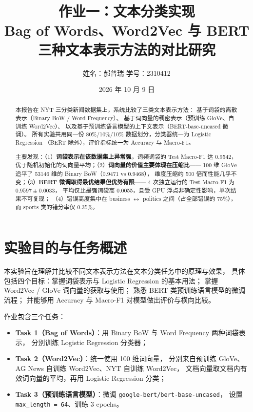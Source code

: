 \documentclass[12pt,a4paper]{ctexart}
\title{\bfseries 作业一：文本分类实现\\[6pt]
\large Bag of Words、Word2Vec 与 BERT 三种文本表示方法的对比研究}
\author{姓名：郝普瑞 \quad 学号：2310412}
\date{2026 年 10 月 9 日}
\newcommand{\fpath}[1]{\texttt{#1}}
\begin{document}
\maketitle

\begin{abstract}
\noindent
本报告在 NYT 三分类新闻数据集上，系统比较了三类文本表示方法：
基于词袋的离散表示（Binary BoW / Word Frequency）、
基于词向量的稠密表示（预训练 GloVe、自训练 Word2Vec）、
以及基于预训练语言模型的上下文表示（BERT-base-uncased 微调）。
所有实验共用同一份 80\%/10\%/10\% 数据划分，分类器统一为 Logistic Regression
（BERT 除外），评价指标统一为 Accuracy 与 Macro-F1。

主要发现：（1）\textbf{词袋表示在该数据集上异常强}，词频词袋的 Test Macro-F1 达 0.9542，
优于随机初始化的词向量平均；（2）\textbf{词向量的价值主要体现在压缩比}——
100 维 GloVe 追平了 53146 维的 Binary BoW（0.9471 vs 0.9468），
维度压缩约 500 倍而性能几乎不变；（3）\textbf{BERT 微调取得最优结果但优势有限}——
4 次独立运行的 Test Macro-F1 为 $0.9597 \pm 0.0033$，
平均仅比最强词袋高 0.0055，且受 GPU 浮点非确定性影响，单次结果不可复现；
（4）错误高度集中在 business $\leftrightarrow$ politics 之间（占全部错误的 75\%），
而 sports 类的错分率仅 0.35\%。
\end{abstract}

\tableofcontents
\newpage

\section{实验目的与任务概述}

本实验旨在理解并比较不同文本表示方法在文本分类任务中的原理与效果，
具体包括四个目标：掌握词袋表示与 Logistic Regression 的基本用法；
掌握 Word2Vec / GloVe 词向量的获取与使用；
熟悉 BERT 类预训练语言模型的微调流程；
并能够用 Accuracy 与 Macro-F1 对模型做出评价与横向比较。

作业包含三个任务：

\begin{itemize}
  \item \textbf{Task 1（Bag of Words）}：用 Binary BoW 与 Word Frequency 两种词袋表示，
        分别训练 Logistic Regression 分类器；
  \item \textbf{Task 2（Word2Vec）}：统一使用 100 维词向量，
        分别来自预训练 GloVe、AG News 自训练 Word2Vec、NYT 自训练 Word2Vec，
        文档向量取文档内有效词向量的平均，再用 Logistic Regression 分类；
  \item \textbf{Task 3（预训练语言模型）}：微调 \fpath{google-bert/bert-base-uncased}，
        设置 \fpath{max\_length = 64}、训练 3 epochs。
\end{itemize}
\end{document}
